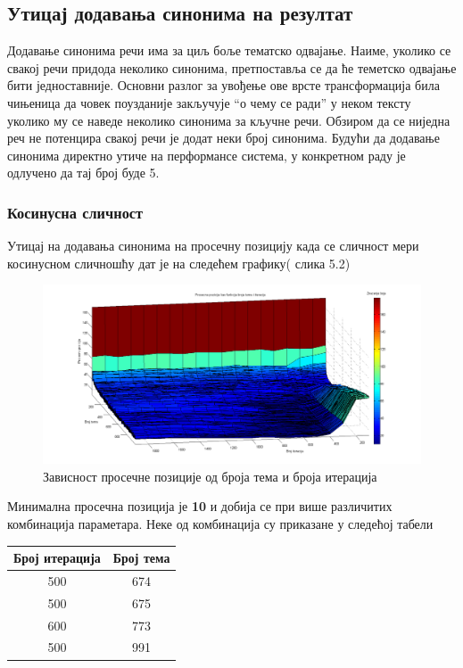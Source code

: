 \subsection{Утицај додавања синонима на резултат}

Додавање синонима речи има за циљ боље тематско одвајање. Наиме, уколико се свакој речи придода неколико синонима, претпоставља се да ће теметско одвајање бити једноставније. Основни разлог за увођење ове врсте трансформација била чињеница да  човек поузданије закључује "`о чему се ради"' у неком тексту уколико му се наведе неколико синонима за кључне речи. Обзиром да се ниједна реч не потенцира свакој речи је додат неки број синонима. Будући да додавање синонима директно утиче на перформансе система, у конкретном раду је одлучено да тај број буде 5.

 


\subsubsection{Косинусна сличност}



Утицај  на додавања синонима на просечну позицију  када се сличност мери косинусном сличношћу дат је на следећем графику( слика 5.2)

		\begin{figure}[H]
    \centering
   \includegraphics[scale=0.3]{./Slike/NoStemmSyn.png} 
	\caption{Зависност просечне позиције од броја тема и броја итерација}
	\label{fig:slika1}
\end{figure}

Минимална просечна позиција је \textbf{10} и добија се при више различитих комбинација параметара. Неке од комбинација су приказане у следећој табели

\begin{center}
\begin{tabular}{|c|c|}
\hline
Број итерација & Број тема \\
\hline\hline
500 & 674 \\
500 & 675 \\
600 & 773 \\
500 & 991 \\
\hline
\end{tabular}
\end{center}


